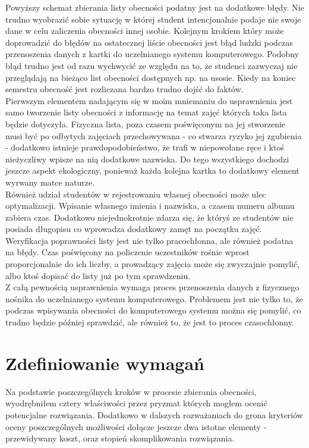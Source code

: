 \documentclass[declaration,shortabstract, mgr]{iithesis}
\begin{document}
\indent Powyższy schemat zbierania listy obecności podatny jest na dodatkowe błędy. Nie trudno wyobrazić sobie sytuację w której student intencjonalnie podaje nie swoje dane w celu zaliczenia obecności innej osobie. Kolejnym krokiem który może doprowadzić do błędów na ostatecznej liście obecności jest błąd ludzki podczas przenoszenia danych z kartki do uczelnianego systemu komputerowego. Podobny błąd trudno jest od razu wychwycić ze względu na to, że studenci zazwyczaj nie przeglądają na bieżąco list obecności dostępnych np. na usosie. Kiedy na koniec semestru obecność jest rozliczana bardzo trudno dojść do faktów.\\
\indent Pierwszym elementem nadającym się w moim mniemaniu do usprawnienia jest samo tworzenie listy obecności z informację na temat zajęć których taka lista będzie dotyczyła. Fizyczna lista, poza czasem poświęconym na jej stworzenie musi być po odbytych zajęciach przechowywana - co stwarza ryzyko jej zgubienia - dodatkowo istnieje prawdopodobieństwo, że trafi w niepowołane ręce i ktoś nieżyczliwy wpisze na nią dodatkowe nazwiska. Do tego wszystkiego dochodzi jeszcze aspekt ekologiczny, ponieważ każda kolejna kartka to dodatkowy element wyrwany matce naturze. \\
\indent Również udział studentów w rejestrowaniu własnej obecności może ulec optymalizacji. Wpisanie własnego imienia i nazwiska, a czasem numeru albumu zabiera czas. Dodatkowo niejednokrotnie zdarza się, że któryś ze studentów nie posiada długopisu co wprowadza dodatkowy zamęt na początku zajęć.\\
\indent Weryfikacja poprawności listy jest nie tylko pracochłonna, ale również podatna na błędy. Czas poświęcony na policzenie uczestników rośnie wprost proporcjonalnie do ich liczby, a prowadzący zajęcia może się zwyczajnie pomylić, albo ktoś dopisać do listy już po tym sprawdzeniu.\\
\indent Z całą pewnością usprawnienia wymaga proces przenoszenia danych z fizycznego nośnika do uczelnianego systemu komputerowego. Problemem jest nie tylko to, że podczas wpisywania obecności do komputerowego systemu można się pomylić, co trudno będzie później sprawdzić, ale również to, że jest to proces czasochłonny.\\

\section{Zdefiniowanie wymagań}
\indent Na podstawie poszczególnych kroków w procesie zbierania obecności, wyodrębniłem cztery właściwości przez pryzmat których mogłem ocenić potencjalne rozwiązania. Dodatkowo w dalszych rozważaniach do grona kryteriów oceny poszczególnych możliwości dołącze jeszcze dwa istotne elementy - przewidywany koszt, oraz stopień skomplikowania rozwiązania.
\end{document}
